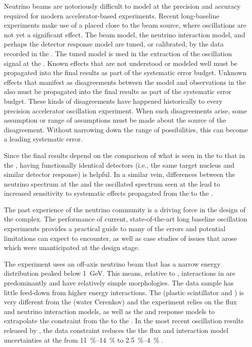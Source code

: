 Neutrino beams are notoriously difficult to model at the precision and accuracy required for modern accelerator-based experiments.  Recent long-baseline experiments make use of a   placed close to the beam source, where oscillations are not yet a significant effect.  The beam model, the neutrino interaction model, and perhaps the detector response model are tuned, or calibrated, by the data recorded in the  . The tuned model is used in the extraction of the oscillation signal at the  . Known effects that are not understood or modeled well must be propagated into the final results as part of the systematic error budget.  Unknown effects that manifest as disagreements between the model and observations in the   also must be propagated into the final results as part of the systematic error budget.  These kinds of disagreements have happened historically to every precision accelerator oscillation experiment.  When such disagreements arise, some assumption or range of assumptions must be made about the source of the disagreement.  Without narrowing down the range of possibilities, this can become a leading systematic error.



Since the final results depend on the comparison of what is seen in the   to that in the  , having functionally identical detectors (i.e., the same target nucleus and similar detector response) is helpful.  In a similar vein, differences between the neutrino spectrum at the   and the oscillated spectrum seen at the   lead to increased sensitivity to systematic effects propagated from the   to the  .

The past experience of the neutrino community is a driving force in the design of the    complex. 
The performance of  current, state-of-the-art long baseline oscillation experiments  provides a practical guide to many of the errors and potential limitations  can expect to encounter, as well as case studies of issues that arose which were unanticipated at the design stage. 

The  experiment uses an off-axis neutrino beam that has a narrow energy distribution peaked below \SI{1}{GeV}. This means, relative to , interactions in  are predominantly  and have relatively simple morphologies.  The data sample has little feed-down from higher energy interactions.  The    (plastic scintillator and ) is very different from the   (water Cerenkov) and the experiment relies on the flux and neutrino interaction models, as well as the  and   response models to extrapolate the constraint from the   to the  .  In the most recent oscillation results released by , the   data constraint reduces the the flux and interaction model uncertainties at the   from \SIrange{11}{14}{\%} to \SIrange{2.5}{4}{\%}  \cite{Abe:2018wpn}.

